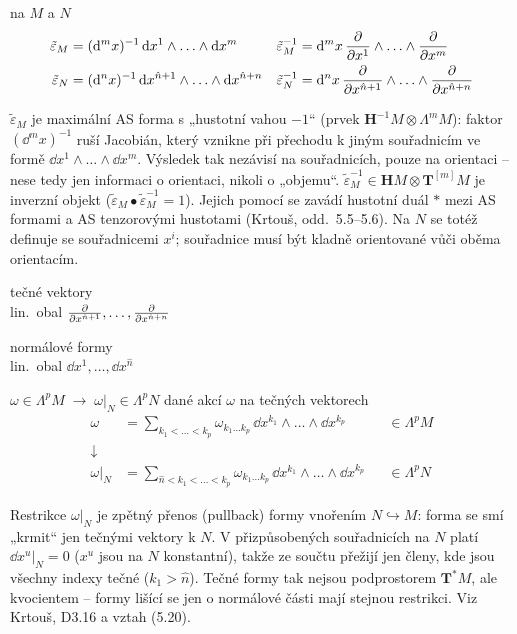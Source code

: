  na $M$ a $N$
\begin{align*}
  \tilde\varepsilon_M &= (\dd^m x)^{-1}\,\dd x^1\wedge\ldots\wedge\dd x^m &
  \tilde\varepsilon_M^{-1} &= \dd^m x\,\pdv{x^1}\wedge\ldots\wedge\pdv{x^m} \\
  \tilde\varepsilon_N &= (\dd^n x)^{-1}\,\dd x^{\hat n+1}\wedge\ldots\wedge\dd x^{\hat n+n} &
  \tilde\varepsilon_N^{-1} &= \dd^n x\,\pdv{x^{\hat n+1}}\wedge\ldots\wedge\pdv{x^{\hat n+n}}
\end{align*}

\begin{vysvetleni}
$\tilde\varepsilon_M$ je maximální AS forma s „hustotní vahou $-1$“ (prvek $\mathbf H^{-1}M\otimes\Lambda^mM$): faktor $(\dd^mx)^{-1}$ ruší Jacobián, který vznikne při přechodu k jiným souřadnicím ve formě $\dd x^1\wedge\ldots\wedge\dd x^m$. Výsledek tak nezávisí na souřadnicích, pouze na orientaci -- nese tedy jen informaci o orientaci, nikoli o „objemu“. $\tilde\varepsilon_M^{-1}\in\mathbf H M\otimes\mathbf T^{[m]}M$ je inverzní objekt ($\tilde\varepsilon_M\bullet\tilde\varepsilon_M^{-1}=1$). Jejich pomocí se zavádí hustotní duál $*$ mezi AS formami a AS tenzorovými hustotami (Krtouš, odd.~5.5--5.6). Na $N$ se totéž definuje se souřadnicemi $x^i$; souřadnice musí být kladně orientované vůči oběma orientacím.
\end{vysvetleni}

tečné vektory \\
\quad lin.\ obal \quad $\pdv{x^{\hat n+1}},\ldots,\pdv{x^{\hat n+n}}$

normálové formy \\
\quad lin.\ obal \quad $\dd x^1,\ldots,\dd x^{\hat n}$

\begin{definice}
$\omega\in\Lambda^pM \;\to\; \omega|_N\in\Lambda^pN$ \quad dané akcí $\omega$ na tečných vektorech
\begin{align*}
  \omega &= \sum_{k_1<\ldots<k_p}\omega_{k_1\ldots k_p}\,\dd x^{k_1}\wedge\ldots\wedge\dd x^{k_p} &&\in\Lambda^pM \\
  \downarrow\ \ & \\
  \omega|_N &= \sum_{\hat n<k_1<\ldots<k_p}\omega_{k_1\ldots k_p}\,\dd x^{k_1}\wedge\ldots\wedge\dd x^{k_p} &&\in\Lambda^pN
\end{align*}
\end{definice}

\begin{vysvetleni}[Restrikce = pullback]
Restrikce $\omega|_N$ je zpětný přenos (pullback) formy vnořením $N\hookrightarrow M$: forma se smí „krmit“ jen tečnými vektory k $N$. V přizpůsobených souřadnicích na $N$ platí $\dd x^u|_N=0$ ($x^u$ jsou na $N$ konstantní), takže ze součtu přežijí jen členy, kde jsou všechny indexy tečné ($k_1>\hat n$). Tečné formy tak nejsou podprostorem $\mathbf T^*M$, ale kvocientem -- formy lišící se jen o normálové části mají stejnou restrikci. Viz Krtouš, D3.16 a vztah (5.20).
\end{vysvetleni}


